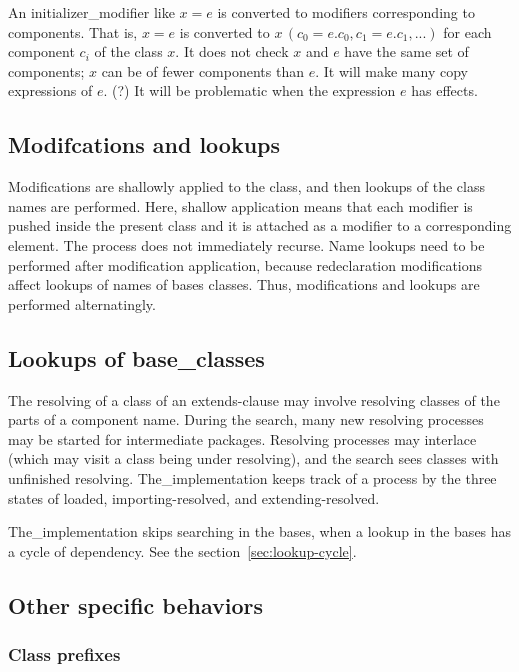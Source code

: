 \documentclass[10pt,b5paper]{article}
\begin{document}
An initializer_modifier like $x=e$ is converted to modifiers
corresponding to components.  That is, $x=e$ is converted to
$x\,(c_0=e.c_0,c_1=e.c_1,...)$ for each component $c_i$ of the class
$x$.  It does not check $x$ and $e$ have the same set of components;
$x$ can be of fewer components than $e$.  It will make many copy
expressions of $e$.  (?) It will be problematic when the expression
$e$ has effects.


\subsection{Modifcations and lookups}

Modifications are shallowly applied to the class, and then lookups of
the class names are performed.  Here, shallow application means that
each modifier is pushed inside the present class and it is attached as
a modifier to a corresponding element.  The process does not
immediately recurse.  Name lookups need to be performed after
modification application, because redeclaration modifications affect
lookups of names of bases classes.  Thus, modifications and lookups
are performed alternatingly.


\subsection{Lookups of base_classes}

The resolving of a class of an extends-clause may involve resolving
classes of the parts of a component name.  During the search, many new
resolving processes may be started for intermediate packages.
Resolving processes may interlace (which may visit a class being under
resolving), and the search sees classes with unfinished resolving.
The_implementation keeps track of a process by the three states of
loaded, importing-resolved, and extending-resolved.

The_implementation skips searching in the bases, when a lookup in the
bases has a cycle of dependency.  See the
section~\ref{sec:lookup-cycle}.


\subsection{Other specific behaviors}

\subsubsection*{Class prefixes}
\end{document}
